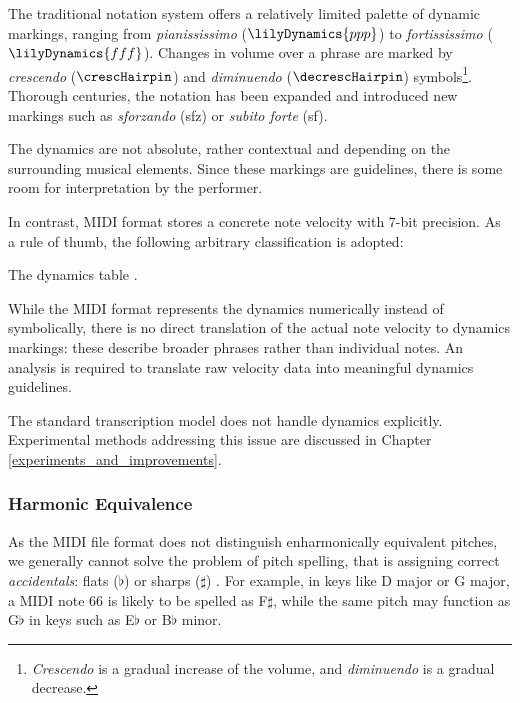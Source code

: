 The traditional notation system offers a relatively limited palette of dynamic markings, ranging from \emph{pianississimo} ($\lilyDynamics{ppp}$) to \emph{fortississimo} ($\lilyDynamics{fff}$). Changes in volume over a phrase are marked by \emph{crescendo} ($\crescHairpin$) and \emph{diminuendo} ($\decrescHairpin$) symbols\footnote{\emph{Crescendo} is a gradual increase of the volume, and \emph{diminuendo} is a gradual decrease.}. Thorough centuries, the notation has been expanded and introduced new markings such as \emph{sforzando} (sfz) or \emph{subito forte} (sf).

The dynamics are not absolute, rather contextual and depending on the surrounding musical elements. Since these markings are guidelines, there is some room for interpretation by the performer.
	 	 
In contrast, MIDI format stores a concrete note velocity with 7-bit precision. As a rule of thumb, the following arbitrary classification is adopted:

\begin{table}[!ht]
\centering

\caption[The dynamics table.]{The dynamics table \cite{Wiki2024C}.}
\end{table}

While the MIDI format represents the dynamics numerically instead of symbolically, there is no direct translation of the actual note velocity to dynamics markings: these describe broader phrases rather than individual notes. An analysis is required to translate raw velocity data into meaningful dynamics guidelines.
	 
The standard transcription model does not handle dynamics explicitly. Experimental methods addressing this issue are discussed in Chapter \ref{experiments_and_improvements}.

\subsubsection{Harmonic Equivalence}\label{harmonic_equivalence}

As the MIDI file format does not distinguish enharmonically  equivalent pitches, we generally cannot solve the problem  of pitch spelling, that is assigning correct \emph{accidentals}: flats ($\flat$) or sharps ($\sharp$) \cite{Cambouropoulos2000}. For example, in keys like D major or G major, a MIDI note 66 is likely to be spelled as F$\sharp$, while the same pitch may function as G$\flat$ in keys such as E$\flat$ or B$\flat$ minor.

